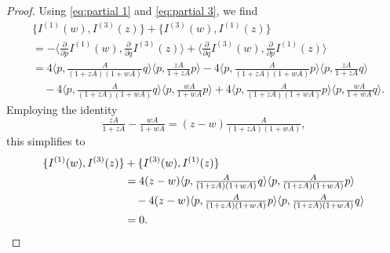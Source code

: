 \documentclass[10pt,a4paper]{amsart}
\newcommand{\la}{\langle}
\newcommand{\ra}{\rangle}
\begin{document}
\begin{proof}
Using \eqref{eq:partial 1} and \eqref{eq:partial 3}, we find
\begin{align*}
&\{I^{(1)}(w),I^{(3)}(z)\} + \{I^{(3)}(w),I^{(1)}(z)\}\\ 
&=-\bigl\langle \tfrac{\partial}{\partial p} I^{(1)}(w),\tfrac{\partial}{\partial q} I^{(3)}(z) \bigr\rangle
	+ \bigl\langle \tfrac{\partial}{\partial q} I^{(3)}(w),\tfrac{\partial}{\partial p} I^{(1)}(z) \bigr\rangle\\
&= 4\la p,\tfrac{A}{(1+zA)(1+wA)}q\ra\la p, \tfrac{zA}{1+z A}p\ra- 4\la p,\tfrac{A}{(1+zA)(1+wA)}p\ra\la p, \tfrac{zA}{1+zA}q\ra\\
&\quad-4\la p,\tfrac{A}{(1+zA)(1+wA)}q\ra\la p, \tfrac{wA}{1+wA}p\ra+4\la p,\tfrac{A}{(1+zA)(1+wA)}p\ra\la p, \tfrac{wA}{1+wA}q\ra.
\end{align*}
Employing the identity
\begin{equation}\label{id}
 \tfrac{zA}{1+z A}- \tfrac{wA}{1+w A} = (z-w) \tfrac{A}{(1+z A)(1+wA)},
\end{equation}
this simplifies to 
\begin{align}\label{eq:poisson_commutativity 2}
\{I^{(1)}(w),I^{(3)}(z)\} &+ \{I^{(3)}(w),I^{(1)}(z)\} \\ 
&=4(z-w)\la p,\tfrac{A}{(1+zA)(1+wA)}q\ra\la p, \tfrac{A}{(1+z A)(1+wA)} p\ra\notag\\
&\quad-4(z-w)\la p,\tfrac{A}{(1+zA)(1+wA)}p\ra\la p, \tfrac{A}{(1+z A)(1+wA)} q\ra\notag\\
&=0.\notag
\end{align}


\end{proof}
\end{document}
